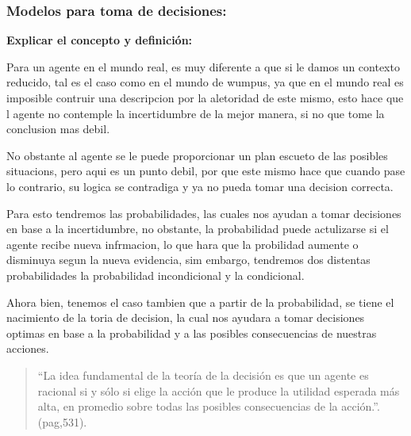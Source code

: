 \documentclass[letterpaper,12pt]{article}
\begin{document}
\subsubsection{Modelos para toma de decisiones:}

\textbf{Explicar el concepto y definición:}

Para un agente en el mundo real, es muy diferente a que si le damos un contexto reducido, tal es el caso como en el mundo de wumpus, ya que en el mundo real es imposible contruir una descripcion por la aletoridad de este mismo, esto hace que l agente no contemple la incertidumbre de la mejor manera, si no que tome la conclusion mas debil.

No obstante al agente se le puede proporcionar un plan escueto de las posibles situacions, pero aqui es un punto debil, por que este mismo hace que cuando pase lo contrario, su logica se contradiga y ya no pueda tomar una decision correcta.

Para esto tendremos las probabilidades, las cuales nos ayudan a tomar decisiones en base a la incertidumbre, no obstante, la probabilidad puede actulizarse si el agente recibe nueva infrmacion, lo que hara que la probilidad aumente o disminuya segun la nueva evidencia, sim embargo, tendremos dos distentas probabilidades la probabilidad incondicional y la condicional.

Ahora bien, tenemos el caso tambien que a partir de la probabilidad, se tiene el nacimiento de la toria de decision, la cual nos ayudara a tomar decisiones optimas en base a la probabilidad y a las posibles consecuencias de nuestras acciones.

\begin{quote}
    ``La idea fundamental de la teoría de la decisión es que un agente es racional si y sólo si
elige la acción que le produce la utilidad esperada más alta, en promedio sobre todas
las posibles consecuencias de la acción.''. (pag,531).
\end{quote}
\end{document}
